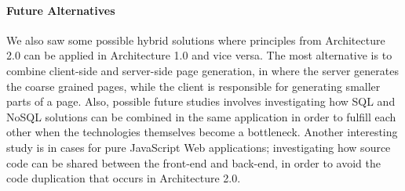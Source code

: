 \paragraph{Future Alternatives}
We also saw some possible hybrid solutions where principles from Architecture 2.0 can be applied in Architecture 1.0 and vice versa. The most alternative is to combine client-side and server-side page generation, in where the server generates the coarse grained pages, while the client is responsible for generating smaller parts of a page. Also, possible future studies involves investigating how SQL and NoSQL solutions can be combined in the same application in order to fulfill each other when the technologies themselves become a bottleneck. Another interesting study is in cases for pure JavaScript Web applications; investigating how source code can be shared between the front-end and back-end, in order to avoid the code duplication that occurs in Architecture 2.0. 


